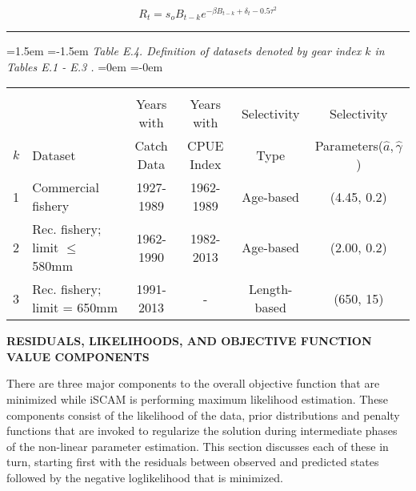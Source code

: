 \documentclass[11pt]{article}   %
\def\AppLet{E}                   %
\def\beq{\vspace{-5ex} \begin{fleqn} \begin{equation}}   %
\def\eeq{\end{equation} \end{fleqn} \vspace{-5ex}}     %
\def\tabline{\vspace{2ex} \hrule \vspace{2ex}}
\def\vsd{\vspace*{1ex}}     %
\begin{document}
 \eec \vspace{1ex}

\vspace{1ex}
\beq R_t = s_oB_{t-k}e^{-\beta B_{t-k}+\delta_t-0.5\tau^2}  \label{df26} \eeq \vsd \vsd \vsd



\noindent \hrule %

\clearpage

\begin{table}[tp]
\leftskip=1.5em
\parindent=-1.5em
{\it Table \AppLet.4. Definition of datasets denoted by gear index $k$ in Tables \AppLet.1 - \AppLet.3 .}
\leftskip=0em
\parindent=-0em
\begin{center}
\begin{tabular}{llcccc} 
\hline \\[-1.5ex]
              &                      & Years with     & Years with    &  Selectivity    &  Selectivity \\ 
$k$	    &Dataset  	       &  Catch Data  & CPUE Index  &  Type           &  Parameters($\hat{a}, \hat{\gamma}$ ) \\ 

\hline %

1 &  Commercial fishery & 1927-1989 & 1962-1989 & Age-based & (4.45, 0.2) \\
2 &  Rec. fishery; limit $\leq$ 580mm & 1962-1990 & 1982-2013 & Age-based& (2.00, 0.2) \\
3 &  Rec. fishery; limit = 650mm & 1991-2013 & - & Length-based & (650, 15) \\

\hline 
\end{tabular} 
\vsd
\end{center}
\end{table}

\medskip


{ \bf RESIDUALS, LIKELIHOODS, AND OBJECTIVE FUNCTION VALUE COMPONENTS}

There are three major components to the overall objective function that are minimized while iSCAM is performing maximum likelihood estimation.  These components consist of the likelihood of the data, prior distributions and penalty functions that are invoked to regularize the solution during intermediate phases of the non-linear parameter estimation.  This section discusses each of these in turn, starting first with the residuals between observed and predicted states followed by the negative loglikelihood that is minimized.
\end{document}
